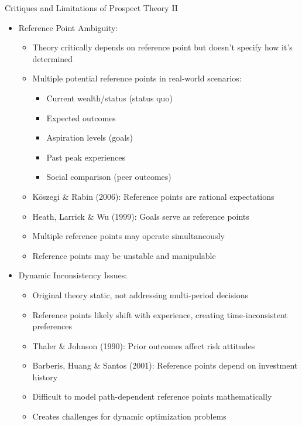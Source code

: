 \documentclass[10pt]{beamer}
\begin{document}
\begin{frame}{Critiques and Limitations of Prospect Theory II}
  \begin{itemize}[<+->]
    \item Reference Point Ambiguity:
      \begin{itemize}
        \item Theory critically depends on reference point but doesn't specify how it's determined
        \item Multiple potential reference points in real-world scenarios:
          \begin{itemize}
            \item Current wealth/status (status quo)
            \item Expected outcomes
            \item Aspiration levels (goals)
            \item Past peak experiences
            \item Social comparison (peer outcomes)
          \end{itemize}
        \item Köszegi \& Rabin (2006): Reference points are rational expectations
        \item Heath, Larrick \& Wu (1999): Goals serve as reference points
        \item Multiple reference points may operate simultaneously
        \item Reference points may be unstable and manipulable
      \end{itemize}
    \item Dynamic Inconsistency Issues:
      \begin{itemize}
        \item Original theory static, not addressing multi-period decisions
        \item Reference points likely shift with experience, creating time-inconsistent preferences
        \item Thaler \& Johnson (1990): Prior outcomes affect risk attitudes
        \item Barberis, Huang \& Santos (2001): Reference points depend on investment history
        \item Difficult to model path-dependent reference points mathematically
        \item Creates challenges for dynamic optimization problems
      \end{itemize}
  \end{itemize}
\end{frame}
\end{document}

